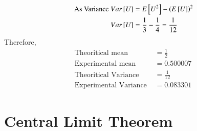 \documentclass[journal,12pt,twocolumn]{IEEEtran}
\renewcommand\thesection{\arabic{section}}
\begin{document}
\begin{enumerate}[label=\thesection.\arabic*
,ref=\thesection.\theenumi]
\begin{enumerate}
\begin{align}
        \text{ As Variance }Var{}\left[U\right]&= E{}\left[U^2\right]-\left(E{}\left[U\right]\right)^2\\
        Var{}\left[U\right]&=\frac{1}{3}-\frac{1}{4}=\frac{1}{12}
    \end{align}
Therefore,
\begin{align}
    \text{Theoritical mean }&=\frac{1}{2}\\
\text{Experimental mean }&=0.500007\\
\text{Theoritical Variance }&=\frac{1}{12}\\
\text{Experimental Variance }&=0.083301
\end{align}
\end{enumerate}
\end{enumerate}

\section{Central Limit Theorem}
\end{document}
